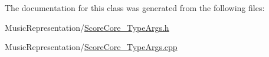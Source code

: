 The documentation for this class was generated from the following files\-:\begin{DoxyCompactItemize}
\item 
Music\-Representation/\hyperlink{_score_core___type_args_8h}{Score\-Core\-\_\-\-Type\-Args.\-h}\item 
Music\-Representation/\hyperlink{_score_core___type_args_8cpp}{Score\-Core\-\_\-\-Type\-Args.\-cpp}\end{DoxyCompactItemize}
